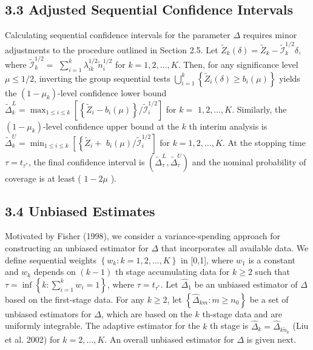 \documentclass[10pt]{article}
\begin{document}
\subsection*{3.3 Adjusted Sequential Confidence Intervals}
Calculating sequential confidence intervals for the parameter $\Delta$ requires minor adjustments to the procedure outlined in Section 2.5. Let $\tilde{Z}_{k}(\delta)=\tilde{Z}_{k}-\tilde{\mathcal{I}}_{k}^{1 / 2} \delta$, where $\tilde{\mathcal{I}}_{k}^{1 / 2}=$ $\sum_{i=1}^{k} \lambda_{i k}^{1 / 2} \tilde{n}_{i}^{1 / 2}$ for $k=1,2, \ldots, K$. Then, for any significance level $\mu \leq 1 / 2$, inverting the group sequential tests $\bigcup_{i=1}^{k}\left\{\tilde{Z}_{i}(\delta) \geq b_{i}(\mu)\right\}$ yields the $\left(1-\mu_{k}\right)$-level confidence lower bound $\tilde{\Delta}_{k}^{L}=\max _{1 \leq i \leq k}\left[\left\{\tilde{Z}_{i}-b_{i}(\mu)\right\} / \tilde{\mathcal{I}}_{i}^{1 / 2}\right]$ for $k=$ $1,2, \ldots, K$. Similarly, the $\left(1-\mu_{k}\right)$-level confidence upper bound at the $k$ th interim analysis is $\tilde{\Delta}_{k}^{U}=\min _{1 \leq i \leq k}\left[\left\{\tilde{Z}_{i}+\right.\right.$ $\left.b_{i}(\mu) / \tilde{\mathcal{I}}_{i}^{1 / 2}\right]$ for $k=1,2, \ldots, K$. At the stopping time $\tau=t_{\tau^{*}}$, the final confidence interval is $\left(\tilde{\Delta}_{\tau}^{L}, \tilde{\Delta}_{\tau}^{U}\right)$ and the nominal probability of coverage is at least ( $1-2 \mu$ ).

\subsection*{3.4 Unbiased Estimates}
Motivated by Fisher (1998), we consider a variance-spending approach for constructing an unbiased estimator for $\Delta$ that incorporates all available data. We define sequential weights $\left\{w_{k}: k=1,2, \ldots, K\right\}$ in [0,1], where $w_{1}$ is a constant and $w_{k}$ depends on $(k-1)$ th stage accumulating data for $k \geq 2$ such that $\tau=\inf \left\{k: \sum_{i=1}^{k} w_{i}=1\right\}$, where $\tau=t_{\tau^{*}}$. Let $\hat{\Delta}_{1}$ be an unbiased estimator of $\Delta$ based on the first-stage data. For any $k \geq 2$, let $\left\{\hat{\Delta}_{k m}: m \geq n_{0}\right\}$ be a set of unbiased estimators for $\Delta$, which are based on the $k$ th-stage data and are uniformly integrable. The adaptive estimator for the $k$ th stage is $\hat{\Delta}_{k}=\hat{\Delta}_{k \tilde{n}_{k}}$ (Liu et al. 2002) for $k=2, \ldots, K$. An overall unbiased estimator for $\Delta$ is given next.
\end{document}
